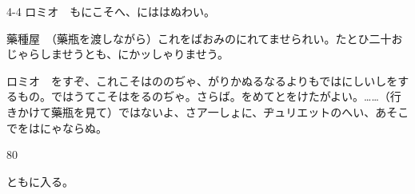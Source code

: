 \documentclass[tate,paper=b6j,jafontsize=9pt]{jlreq}
\begin{document}
\begin{azconvIndented}{4\zw}{-4\zw}
ロミオ　もにこそへ、にははぬわい。

藥種屋　（藥瓶を渡しながら）これをばおみのにれてませられい。たとひ二十おじゃらしませうとも、にかッしゃりませう。

ロミオ　をすぞ、これこそはののぢゃ、がりかぬるなるよりもではにしいしをするもの。ではうてこそはをるのぢゃ。さらば。をめてとをけたがよい。……（行きかけて藥瓶を見て）ではないよ、さア一しょに、ヂュリエットのへい、あそこでをはにゃならぬ。

\end{azconvIndented}
\begin{azconvIndented}{8\zw}{0\zw}

ともに入る。

\end{azconvIndented}

\end{document}
